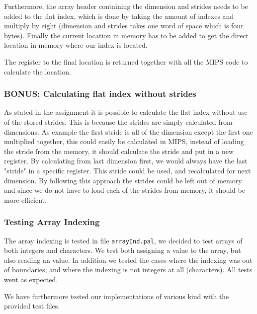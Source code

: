 \documentclass[10pt]{article}
\begin{document}
Furthermore, the array header containing the dimension and strides needs to be added to the flat index, which is done by taking the amount of indexes and multiply by eight (dimension and strides takes one word of space which is four bytes). Finally the current location in memory has to be added to get the direct location in memory where our index is located.

The register to the final location is returned together with all the MIPS code to calculate the location.

\subsubsection*{BONUS: Calculating flat index without strides}
As stated in the assignment it is possible to calculate the flat index without use of the stored strides. This is because the strides are simply calculated from dimensions. As example the first stride is all of the dimension except the first one multiplied together, this could easily be calculated in MIPS, instead of loading the stride from the memory, it should calculate the stride and put in a new register. By calculating from last dimension first, we would always have the last "stride" in a specific register. This stride could be used, and recalculated for next dimension. By following this approach the strides could be left out of memory and since we do not have to load each of the strides from memory, it should be more efficient.

\subsubsection{Testing Array Indexing}
The array indexing is tested in file \texttt{arrayInd.pal}, we decided to test arrays of both integers and characters. We test both assigning a value to the array, but also reading an value. In addition we tested the cases where the indexing was out of boundaries, and where the indexing is not integers at all (characters). All tests went as expected.

We have furthermore tested our implementations of various kind with the provided test files.
\end{document}
